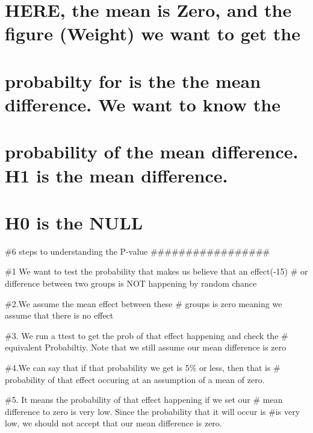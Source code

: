 \documentclass[
]{article}
\begin{document}
\hypertarget{here-the-mean-is-zero-and-the-figure-weight-we-want-to-get-the}{%
\section{HERE, the mean is Zero, and the figure (Weight) we want to get
the}\label{here-the-mean-is-zero-and-the-figure-weight-we-want-to-get-the}}

\hypertarget{probabilty-for-is-the-the-mean-difference.-we-want-to-know-the}{%
\section{probabilty for is the the mean difference. We want to know
the}\label{probabilty-for-is-the-the-mean-difference.-we-want-to-know-the}}

\hypertarget{probability-of-the-mean-difference.-h1-is-the-mean-difference.}{%
\section{probability of the mean difference. H1 is the mean
difference.}\label{probability-of-the-mean-difference.-h1-is-the-mean-difference.}}

\hypertarget{h0-is-the-null}{%
\section{H0 is the NULL}\label{h0-is-the-null}}

\#6 steps to understanding the P-value
\#\#\#\#\#\#\#\#\#\#\#\#\#\#\#\#\#

\#1 We want to test the probability that makes us believe that an
effect(-15) \# or difference between two groups is NOT happening by
random chance

\#2.We assume the mean effect between these \# groups is zero meaning we
assume that there is no effect

\#3. We run a ttest to get the prob of that effect happening and check
the \# equivalent Probabiltiy. Note that we still assume our mean
difference is zero

\#4.We can say that if that probability we get is 5\% or less, then that
is \# probability of that effect occuring at an assumption of a mean of
zero.

\#5. It means the probability of that effect happening if we set our \#
mean difference to zero is very low. Since the probability that it will
occur is \#is very low, we should not accept that our mean difference is
zero.
\end{document}
